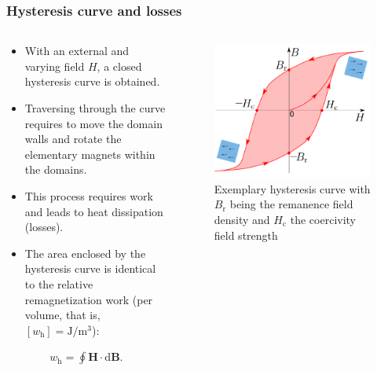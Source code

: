 \begin{frame}
	\frametitle{Hysteresis curve and losses}
	\begin{columns}
		\begin{column}{0.5\textwidth}
            \begin{itemize}
                \item With an external and varying field $H$, a closed hysteresis curve is obtained.
                \item Traversing through the curve requires to move the domain walls and rotate the elementary magnets within the domains.
                \item This process requires work and leads to heat dissipation (losses).
                \item The area enclosed by the hysteresis curve is identical to the relative remagnetization work (per volume, that is, $[w_{\mathrm{h}}]=\si{\joule\per\metre\cubed}$):
            \end{itemize}
            \begin{align}
                w_{\mathrm{h}} = \oint \bm{H} \cdot \mathrm{d}\bm{B}.
            \end{align}
		\end{column}
        \hfill
		\begin{column}{0.475\textwidth}
            \vspace{-0.2cm}
			\begin{figure}
				\centering
				\includegraphics[height=0.55\textheight]{fig/lec02/Hyteresis_curve_full.pdf}
				\caption{Exemplary hysteresis curve with $B_\mathrm{r}$ being the remanence field density and $H_\mathrm{c}$ the coercivity field strength}
			\end{figure}
		\end{column}
		\end{columns}
\end{frame}

